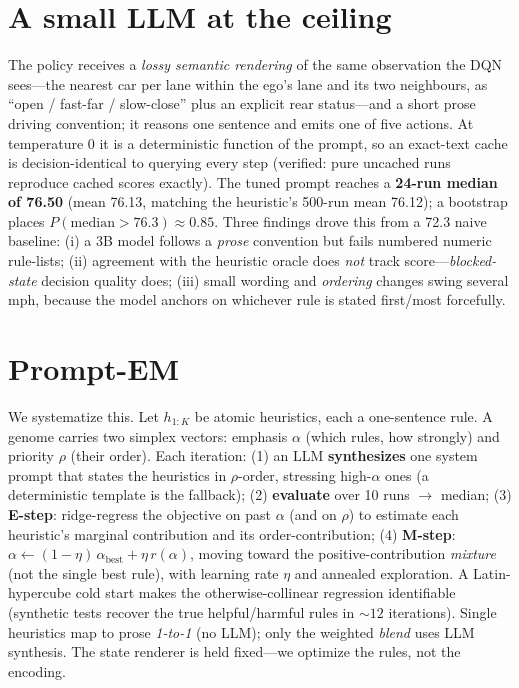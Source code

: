 \documentclass[10pt]{article}
\begin{document}
\section{A small LLM at the ceiling}
The policy receives a \emph{lossy semantic rendering} of the same observation the
DQN sees---the nearest car per lane within the ego's lane and its two neighbours,
as ``open / fast-far / slow-close'' plus an explicit rear status---and
a short prose driving convention; it reasons one sentence and emits one of five
actions. At temperature $0$ it is a deterministic function of the prompt, so an
exact-text cache is decision-identical to querying every step (verified: pure
uncached runs reproduce cached scores exactly). The tuned prompt reaches a
\textbf{24-run median of 76.50} (mean 76.13, matching the heuristic's 500-run mean
76.12); a bootstrap places $P(\mathrm{median}>76.3)\approx0.85$. Three findings
drove this from a 72.3 naive baseline: (i) a 3B model follows a \emph{prose}
convention but fails numbered numeric rule-lists; (ii) agreement with the
heuristic oracle does \emph{not} track score---\emph{blocked-state} decision
quality does; (iii) small wording and \emph{ordering} changes swing several mph,
because the model anchors on whichever rule is stated first/most forcefully.

\section{Prompt-EM}
We systematize this. Let $h_{1{:}K}$ be atomic heuristics, each a
one-sentence rule. A genome carries two simplex vectors: emphasis $\alpha$ (which
rules, how strongly) and priority $\rho$ (their order). Each iteration: (1) an LLM
\textbf{synthesizes} one system prompt that states the heuristics in
$\rho$-order, stressing high-$\alpha$ ones (a deterministic template is the
fallback); (2) \textbf{evaluate} over 10 runs $\rightarrow$ median; (3)
\textbf{E-step}: ridge-regress the objective on past $\alpha$ (and on $\rho$) to
estimate each heuristic's marginal contribution and its order-contribution;
(4) \textbf{M-step}: $\alpha\!\leftarrow\!(1{-}\eta)\,\alpha_{\text{best}}+\eta\,
r(\alpha)$, moving toward the positive-contribution \emph{mixture} (not the single
best rule), with learning rate $\eta$ and annealed exploration. A Latin-hypercube
cold start makes the otherwise-collinear regression identifiable (synthetic tests
recover the true helpful/harmful rules in ${\sim}12$ iterations). Single
heuristics map to prose \emph{1-to-1} (no LLM); only the weighted \emph{blend}
uses LLM synthesis. The state renderer is held fixed---we optimize the rules, not
the encoding.
\end{document}
